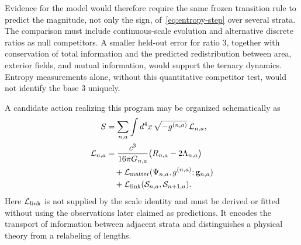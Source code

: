 \documentclass[11pt]{amsart}
\theoremstyle{definition}
\theoremstyle{remark}
\begin{document}
Evidence for the model would therefore require the same frozen transition rule to predict the
magnitude, not only the sign, of~\eqref{eq:entropy-step} over several strata.  The comparison must
include continuous-scale evolution and alternative discrete ratios as null competitors.  A
smaller held-out error for ratio $3$, together with conservation of total information and the
predicted redistribution between area, exterior fields, and mutual information, would support
the ternary dynamics.  Entropy measurements alone, without this quantitative competitor test,
would not identify the base $3$ uniquely.

A candidate action realizing this program may be organized schematically as
\begin{equation}\label{eq:cross-scale-action}
  \begin{aligned}
  S&=\sum_{n,a}\int d^4x\,\sqrt{-g^{(n,a)}}\,\mathcal L_{n,a},\\
  \mathcal L_{n,a}
  &=\frac{c^3}{16\pi G_{n,a}}\bigl(R_{n,a}-2\Lambda_{n,a}\bigr)\\
  &\quad+\mathcal L_{\rm matter}(\Psi_{n,a},g^{(n,a)};\mathbf g_{n,a})\\
  &\quad+\mathcal L_{\rm link}(\mathcal S_{n,a},\mathcal S_{n+1,a}).
  \end{aligned}
\end{equation}
Here $\mathcal L_{\rm link}$ is not supplied by the scale identity and must be derived or fitted
without using the observations later claimed as predictions.  It encodes the transport of
information between adjacent strata and distinguishes a physical theory from a relabeling of
lengths.
\end{document}
